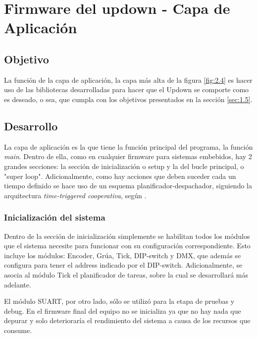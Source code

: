 
\section{Firmware del updown - Capa de Aplicación} \label{sec:\thesection}

\subsection{Objetivo}
La función de la capa de aplicación, la capa más alta de la figura \ref{fig:2.4} es hacer uso de las bibliotecas desarrolladas para hacer que el Updown se comporte como es deseado, o sea, que cumpla con los objetivos presentados en la sección \ref{sec:1.5}.

\subsection{Desarrollo}
La capa de aplicación es la que tiene la función principal del programa, la función \textit{main}. Dentro de ella, como en cualquier firmware para sistemas embebidos, hay 2 grandes secciones: la sección de inicialización o setup y la del bucle principal, o "super loop". Adicionalmente, como hay acciones que deben suceder cada un tiempo definido se hace uso de un esquema planificador-despachador, siguiendo la arquitectura \textit{time-triggered cooperativa}, según \cite{sec3_6_2}.

\subsubsection{Inicialización del sistema}

Dentro de la sección de inicialización simplemente se habilitan todos los módulos que el sistema necesite para funcionar con su configuración correspondiente. Esto incluye los módulos: Encoder, Grúa, Tick, DIP-switch y DMX, que además se configura para tener el address indicado por el DIP-switch. Adicionalmente, se asocia al módulo Tick el planificador de tareas, sobre la cual se desarrollará más adelante.

El módulo SUART, por otro lado, sólo se utilizó para la etapa de pruebas y debug. En el firmware final del equipo no se inicializa ya que no hay nada que depurar y solo deterioraría el rendimiento del sistema a causa de los recursos que consume. 


